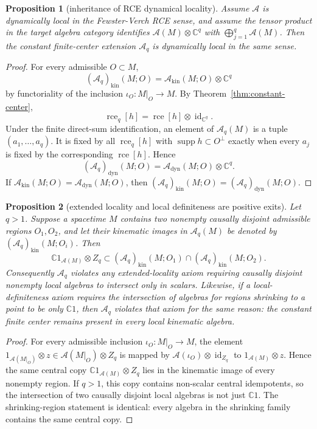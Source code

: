 \documentclass[12pt]{article}
\newtheorem{proposition}{Proposition}
\theoremstyle{remark}
\newcommand{\A}{\mathcal A}
\newcommand{\C}{\mathbb C}
\newcommand{\rce}{\operatorname{rce}}
\begin{document}
\begin{proposition}[inheritance of RCE dynamical locality]
\label{prop:dynloc}
Assume \(\A\) is dynamically local in the Fewster-Verch RCE sense, and assume
the tensor product in the target algebra category identifies
\(\A(M)\otimes\C^q\) with \(\bigoplus_{j=1}^q\A(M)\).  Then the constant
finite-center extension \(\A_q\) is dynamically local in the same sense.
\end{proposition}

\begin{proof}
For every admissible \(O\subset M\),
\[
  (\A_q)_{\mathrm{kin}}(M;O)
  =
  \A_{\mathrm{kin}}(M;O)\otimes \C^q
\]
by functoriality of the inclusion \(\iota_O:M|_O\to M\).  By
Theorem~\ref{thm:constant-center},
\[
  \rce_q[h]=\rce[h]\otimes \operatorname{id}_{\C^q}.
\]
Under the finite direct-sum identification, an element of \(\A_q(M)\) is a
tuple \((a_1,\ldots,a_q)\).  It is fixed by all \(\rce_q[h]\) with
\(\operatorname{supp}h\subset O^\perp\) exactly when every \(a_j\) is fixed by
the corresponding \(\rce[h]\).  Hence
\[
  (\A_q)_{\mathrm{dyn}}(M;O)
  =
  \A_{\mathrm{dyn}}(M;O)\otimes \C^q.
\]
If \(\A_{\mathrm{kin}}(M;O)=\A_{\mathrm{dyn}}(M;O)\), then
\((\A_q)_{\mathrm{kin}}(M;O)=(\A_q)_{\mathrm{dyn}}(M;O)\).
\end{proof}

\begin{proposition}[extended locality and local definiteness are positive exits]
\label{prop:extended-locality}
Let \(q>1\).  Suppose a spacetime \(M\) contains two nonempty causally disjoint
admissible regions \(O_1,O_2\), and let their kinematic images in
\(\A_q(M)\) be denoted by \((\A_q)_{\mathrm{kin}}(M;O_i)\).  Then
\[
  \C 1_{\A(M)}\otimes Z_q
  \subset
  (\A_q)_{\mathrm{kin}}(M;O_1)
  \cap
  (\A_q)_{\mathrm{kin}}(M;O_2).
\]
Consequently \(\A_q\) violates any extended-locality axiom requiring causally
disjoint nonempty local algebras to intersect only in scalars.  Likewise, if a
local-definiteness axiom requires the intersection of algebras for regions
shrinking to a point to be only \(\C 1\), then \(\A_q\) violates that axiom for
the same reason: the constant finite center remains present in every local
kinematic algebra.
\end{proposition}

\begin{proof}
For every admissible inclusion \(\iota_O:M|_O\to M\), the element
\(1_{\A(M|_O)}\otimes z\in \A(M|_O)\otimes Z_q\) is mapped by
\(\A(\iota_O)\otimes\operatorname{id}_{Z_q}\) to
\(1_{\A(M)}\otimes z\).  Hence the same central copy
\(\C 1_{\A(M)}\otimes Z_q\) lies in the kinematic image of every nonempty
region.  If \(q>1\), this copy contains non-scalar central idempotents, so the
intersection of two causally disjoint local algebras is not just \(\C 1\).
The shrinking-region statement is identical: every algebra in the shrinking
family contains the same central copy.
\end{proof}
\end{document}
